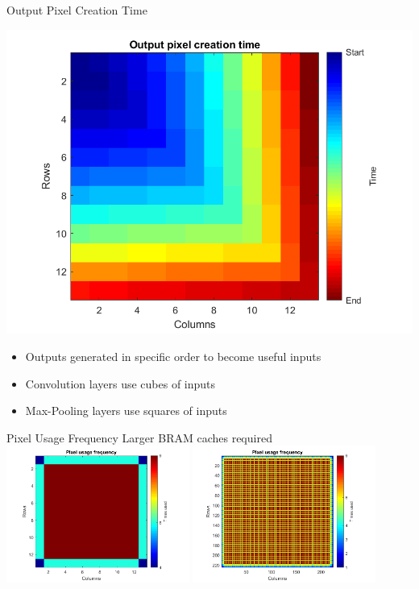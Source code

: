 \begin{frame}{Output Pixel Creation Time}
	\begin{minipage}{0.6\textwidth}
		\centering
		\includegraphics[width=\textwidth]{../Images/Scheduling/Conv5-output-creation-time.png}\\
	\end{minipage}%
	\begin{minipage}{0.4\textwidth}
		\begin{itemize}
			\item Outputs generated in specific order to become useful inputs
			\item Convolution layers use cubes of inputs
			\item Max-Pooling layers use squares of inputs
		\end{itemize}
	\end{minipage}
\end{frame}

\begin{frame}{Pixel Usage Frequency}
	\centering
	\large Larger BRAM caches required\\
	\includegraphics[width=0.45\textwidth]{../Images/Scheduling/Conv5-pixel-frequency.png}
	\includegraphics[width=0.45\textwidth]{../Images/Scheduling/Conv1-pixel-frequency.png}\\
\end{frame}

